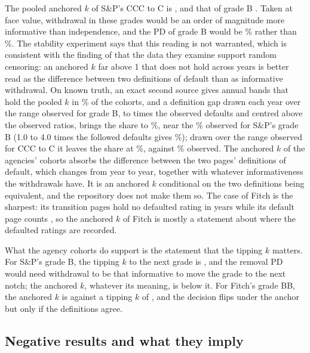 The pooled anchored $k$ of S\&P's CCC to C is , and that of grade B . Taken at face value, withdrawal in these grades would be an order of magnitude more informative than independence, and the PD of grade B would be \% rather than \%. The stability experiment says that this reading is not warranted, which is consistent with the finding of \citet{cantor2007} that the data they examine support random censoring: an anchored $k$ far above 1 that does not hold across years is better read as the difference between two definitions of default than as informative withdrawal. On known truth, an exact second source gives annual bands that hold the pooled $k$ in \% of the cohorts, and a definition gap drawn each year over the range observed for grade B,  to  times the observed defaults and centred above the observed ratios, brings the share to \%, near the \% observed for S\&P's grade B (1.0 to 4.0 times the followed defaults gives \%); drawn over the range observed for CCC to C it leaves the share at \%, against \% observed. The anchored $k$ of the agencies' cohorts absorbs the difference between the two pages' definitions of default, which changes from year to year, together with whatever informativeness the withdrawals have. It is an anchored $k$ conditional on the two definitions being equivalent, and the repository does not make them so. The case of Fitch is the sharpest: its transition pages hold no defaulted rating in  years while its default page counts , so the anchored $k$ of Fitch is mostly a statement about where the defaulted ratings are recorded.

What the agency cohorts do support is the statement that the tipping $k$ matters. For S\&P's grade B, the tipping $k$ to the next grade is , and the removal PD would need withdrawal to be that informative to move the grade to the next notch; the anchored $k$, whatever its meaning, is below it. For Fitch's grade BB, the anchored $k$ is  against a tipping $k$ of , and the decision flips under the anchor but only if the definitions agree.

\subsection{Negative results and what they imply}

